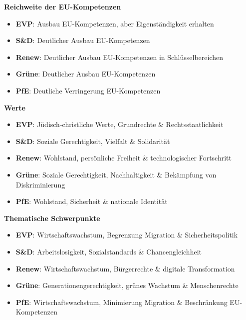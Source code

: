 \documentclass[11pt]{article}
\begin{document}
\begin{minipage}[t]{0.45\textwidth}
    \textbf{\Large Reichweite der EU-Kompetenzen}
    \raggedright
    \begin{itemize}
        \item \textbf{EVP}: {\small Ausbau EU-Kompetenzen, aber Eigenständigkeit erhalten}
        \item \textbf{S\&D}: {\small Deutlicher Ausbau EU-Kompetenzen}
        \item \textbf{Renew}: {\small Deutlicher Ausbau EU-Kompetenzen in Schlüsselbereichen}
        \item \textbf{Grüne}: {\small Deutlicher Ausbau EU-Kompetenzen}
        \item \textbf{PfE}: {\small Deutliche Verringerung EU-Kompetenzen}
    \end{itemize}
    \textbf{\Large Werte}
    \raggedright
    \begin{itemize}
        \item \textbf{EVP}: {\small Jüdisch-christliche Werte, Grundrechte \& Rechtsstaatlichkeit}
        \item \textbf{S\&D}: {\small Soziale Gerechtigkeit, Vielfalt \& Solidarität}
        \item \textbf{Renew}: {\small Wohlstand, persönliche Freiheit \& technologischer Fortschritt}
        \item \textbf{Grüne}: {\small Soziale Gerechtigkeit, Nachhaltigkeit \& Bekämpfung von Diskriminierung}
        \item \textbf{PfE}: {\small Wohlstand, Sicherheit \& nationale Identität}
    \end{itemize}
    \textbf{\Large Thematische Schwerpunkte}
    \raggedright
    \begin{itemize}
        \item \textbf{EVP}: {\small Wirtschaftswachstum, Begrenzung Migration \& Sicherheitspolitik}
        \item \textbf{S\&D}: {\small Arbeitslosigkeit, Sozialstandards \& Chancengleichheit}
        \item \textbf{Renew}: {\small Wirtschaftswachstum, Bürgerrechte \& digitale Transformation}
        \item \textbf{Grüne}: {\small Generationengerechtigkeit, grünes Wachstum \& Menschenrechte}
        \item \textbf{PfE}: {\small Wirtschaftswachstum, Minimierung Migration \& Beschränkung EU-Kompetenzen}
    \end{itemize}
    
\end{minipage}%
\end{document}
